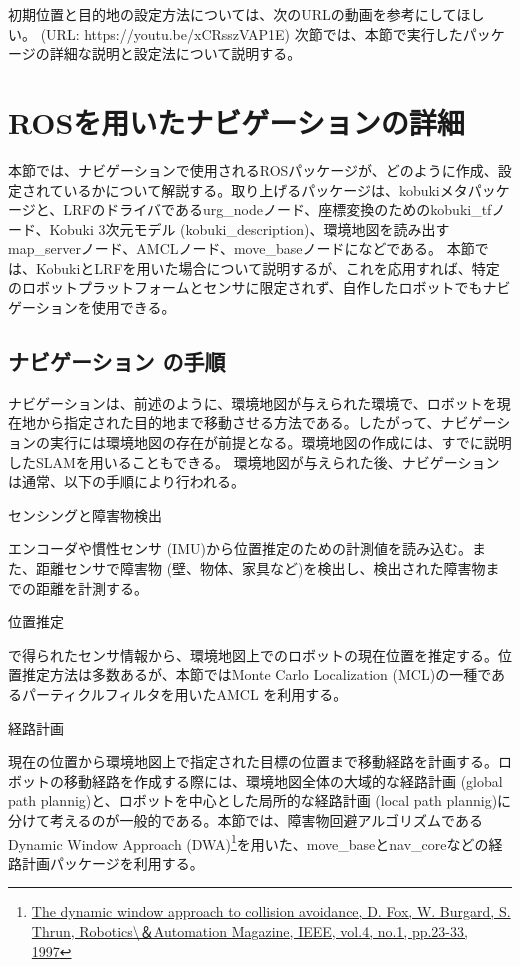 初期位置と目的地の設定方法については、次のURLの動画を参考にしてほしい。 (URL: https://youtu.be/xCRsszVAP1E)
次節では、本節で実行したパッケージの詳細な説明と設定法について説明する。

\section{ROSを用いたナビゲーションの詳細}

本節では、ナビゲーションで使用されるROSパッケージが、どのように作成、設定されているかについて解説する。取り上げるパッケージは、kobukiメタパッケージと、LRFのドライバであるurg\_nodeノード、座標変換のためのkobuki\_tfノード、Kobuki 3次元モデル (kobuki\_description)、環境地図を読み出すmap\_serverノード、AMCLノード、move\_baseノードになどである。
本節では、KobukiとLRFを用いた場合について説明するが、これを応用すれば、特定のロボットプラットフォームとセンサに限定されず、自作したロボットでもナビゲーションを使用できる。

\subsection{ナビゲーション  の手順}

ナビゲーションは、前述のように、環境地図が与えられた環境で、ロボットを現在地から指定された目的地まで移動させる方法である。したがって、ナビゲーションの実行には環境地図の存在が前提となる。環境地図の作成には、すでに説明したSLAMを用いることもできる。
環境地図が与えられた後、ナビゲーションは通常、以下の手順により行われる。

\setcounter{num}{0}

\circled{\thenum} センシングと障害物検出

エンコーダや慣性センサ (IMU)から位置推定のための計測値を読み込む。また、距離センサで障害物 (壁、物体、家具など)を検出し、検出された障害物までの距離を計測する。

\circled{\thenum} 位置推定

 で得られたセンサ情報から、環境地図上でのロボットの現在位置を推定する。位置推定方法は多数あるが、本節ではMonte Carlo Localization (MCL)の一種であるパーティクルフィルタを用いたAMCL を利用する。

\circled{\thenum} 経路計画

現在の位置から環境地図上で指定された目標の位置まで移動経路を計画する。ロボットの移動経路を作成する際には、環境地図全体の大域的な経路計画 (global path plannig)と、ロボットを中心とした局所的な経路計画 (local path plannig)に分けて考えるのが一般的である。本節では、障害物回避アルゴリズムであるDynamic Window Approach (DWA)\footnote{\url{The dynamic window approach to collision avoidance, D. Fox, W. Burgard, S. Thrun, Robotics\＆Automation Magazine, IEEE, vol.4, no.1, pp.23-33, 1997}}を用いた、move\_baseとnav\_coreなどの経路計画パッケージを利用する。


